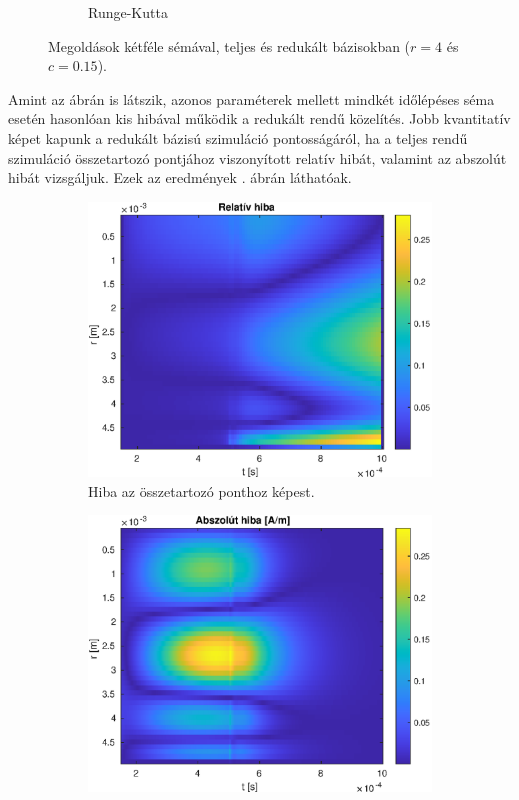 \begin{figure}[h]
\begin{subfigure}{0.48\textwidth}
                \caption{Runge-Kutta}
            \end{subfigure}
            \caption{Megoldások kétféle sémával, teljes és redukált bázisokban ($r=4$ és $c=0.15$).}
            \label{fig:sema}
        \end{figure}
        \par
        Amint az ábrán is látszik, azonos paraméterek mellett mindkét időlépéses séma esetén hasonlóan kis hibával működik a redukált rendű közelítés. Jobb kvantitatív képet kapunk a redukált bázisú szimuláció pontosságáról, ha a teljes rendű szimuláció összetartozó pontjához viszonyított relatív hibát, valamint az abszolút hibát vizsgáljuk. Ezek az eredmények . ábrán láthatóak.
        \begin{figure}[h]
            \centering
            \begin{subfigure}{0.48\textwidth}
                \includegraphics[width=\textwidth]{kep/euler_0.15_4_rel_error.eps}
                \caption{Hiba az összetartozó ponthoz képest.}
            \end{subfigure}
            \begin{subfigure}{0.48\textwidth}
                \includegraphics[width=\textwidth]{kep/euler_0.15_4_abs_error.eps}

\end{subfigure}
\end{figure}
